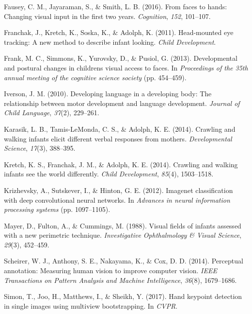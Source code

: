\documentclass[10pt, letterpaper]{article}
\begin{document}
\hypertarget{ref-fausey2016}{}
Fausey, C. M., Jayaraman, S., \& Smith, L. B. (2016). From faces to
hands: Changing visual input in the first two years. \emph{Cognition},
\emph{152}, 101--107.

\hypertarget{ref-franchak2011}{}
Franchak, J., Kretch, K., Soska, K., \& Adolph, K. (2011). Head-mounted
eye tracking: A new method to describe infant looking. \emph{Child
Development}.

\hypertarget{ref-frank2013}{}
Frank, M. C., Simmons, K., Yurovsky, D., \& Pusiol, G. (2013).
Developmental and postural changes in childrens visual access to faces.
In \emph{Proceedings of the 35th annual meeting of the cognitive science
society} (pp. 454--459).

\hypertarget{ref-iverson2010}{}
Iverson, J. M. (2010). Developing language in a developing body: The
relationship between motor development and language development.
\emph{Journal of Child Language}, \emph{37}(2), 229--261.

\hypertarget{ref-karasik2014}{}
Karasik, L. B., Tamis-LeMonda, C. S., \& Adolph, K. E. (2014). Crawling
and walking infants elicit different verbal responses from mothers.
\emph{Developmental Science}, \emph{17}(3), 388--395.

\hypertarget{ref-kretch2014}{}
Kretch, K. S., Franchak, J. M., \& Adolph, K. E. (2014). Crawling and
walking infants see the world differently. \emph{Child Development},
\emph{85}(4), 1503--1518.

\hypertarget{ref-krizhevsky2012imagenet}{}
Krizhevsky, A., Sutskever, I., \& Hinton, G. E. (2012). Imagenet
classification with deep convolutional neural networks. In
\emph{Advances in neural information processing systems} (pp.
1097--1105).

\hypertarget{ref-mayer1988}{}
Mayer, D., Fulton, A., \& Cummings, M. (1988). Visual fields of infants
assessed with a new perimetric technique. \emph{Investigative
Ophthalmology \& Visual Science}, \emph{29}(3), 452--459.

\hypertarget{ref-scheirer2014perceptual}{}
Scheirer, W. J., Anthony, S. E., Nakayama, K., \& Cox, D. D. (2014).
Perceptual annotation: Measuring human vision to improve computer
vision. \emph{IEEE Transactions on Pattern Analysis and Machine
Intelligence}, \emph{36}(8), 1679--1686.

\hypertarget{ref-simon2017hand}{}
Simon, T., Joo, H., Matthews, I., \& Sheikh, Y. (2017). Hand keypoint
detection in single images using multiview bootstrapping. In
\emph{CVPR}.
\end{document}

